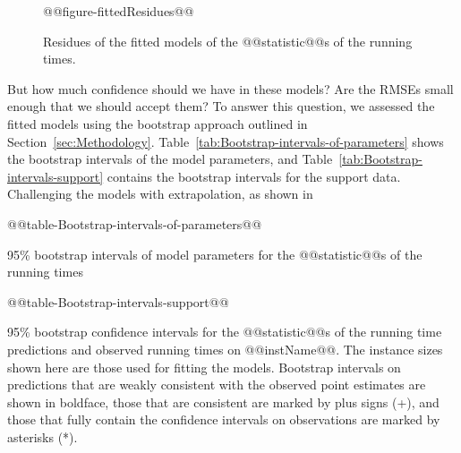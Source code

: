 \begin{figure}[tb]
\noindent \begin{centering}
@@figure-fittedResidues@@
\par\end{centering}

\caption{\label{fig:Fitted-residues} Residues of the fitted models of the @@statistic@@s of the  running times. }
\end{figure}


But how much confidence should we have in these models? Are the RMSEs
small enough that we should accept them? To answer this question,
we assessed the fitted models using the bootstrap approach outlined
in Section~\ref{sec:Methodology}. Table~\ref{tab:Bootstrap-intervals-of-parameters}
shows the bootstrap intervals of the model parameters,
and Table~\ref{tab:Bootstrap-intervals-support}
contains the bootstrap intervals for the support data.
Challenging the models with extrapolation, as shown in 
\begin{table*}[tb]
\noindent \begin{centering}
@@table-Bootstrap-intervals-of-parameters@@
% 

\par\end{centering}
\caption{\label{tab:Bootstrap-intervals-of-parameters} 95\% bootstrap intervals
of model parameters for the @@statistic@@s of the  running times}
\end{table*}
\begin{table*}[tb]
\noindent \begin{centering}
@@table-Bootstrap-intervals-support@@
% 
\par\end{centering}

\caption{\label{tab:Bootstrap-intervals-support} 95\% bootstrap confidence intervals
for the @@statistic@@s of the  running time predictions and observed running times on @@instName@@. 
The instance sizes shown here are those used for fitting the models.
Bootstrap intervals on predictions that are weakly consistent
with the observed point estimates are shown in boldface, 
those that are consistent are marked by plus signs ({+}),
and those that fully contain the confidence intervals on 
observations are marked by asterisks ({*}).}
\end{table*}

